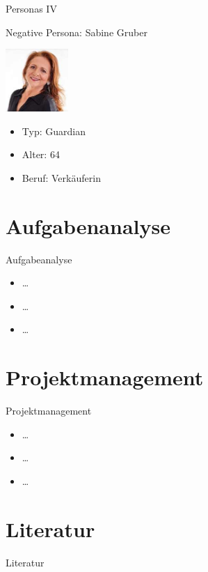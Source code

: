 \documentclass[presentation,bigger,aspectratio=169]{beamer}
\begin{document}
\begin{frame}[label={sec:org06625a5}]{Personas IV}
\begin{block}{Negative Persona: Sabine Gruber}
\begin{center}
\includegraphics[width=90px]{./img/m1_persona_4_guardian.jpg}
\end{center}
\begin{itemize}
\item Typ: Guardian
\item Alter: 64
\item Beruf: Verkäuferin
\end{itemize}
\end{block}
\end{frame}
\section{Aufgabenanalyse}
\label{sec:org6725135}
\begin{frame}[label={sec:orge1e4eed}]{\vspace{2.2cm}\begin{center}\MakeUppercase{\insertsection}\end{center}}
\end{frame}

\begin{frame}[label={sec:org013f523}]{Aufgabeanalyse}
\begin{itemize}
\item \ldots{}
\item \ldots{}
\item \ldots{}
\end{itemize}
\end{frame}
\section{Projektmanagement}
\label{sec:org0b1a8e7}
\begin{frame}[label={sec:orgcfc3775}]{\vspace{2.2cm}\begin{center}\MakeUppercase{\insertsection}\end{center}}
\end{frame}

\begin{frame}[label={sec:orgba33c6a}]{Projektmanagement}
\begin{itemize}
\item \ldots{}
\item \ldots{}
\item \ldots{}
\end{itemize}
\end{frame}
\section*{Literatur}
\label{sec:org15124f5}
\begin{frame}[allowframebreaks]{Literatur}
\printbibliography[heading=none]
\end{frame}
\appendix
\end{document}
